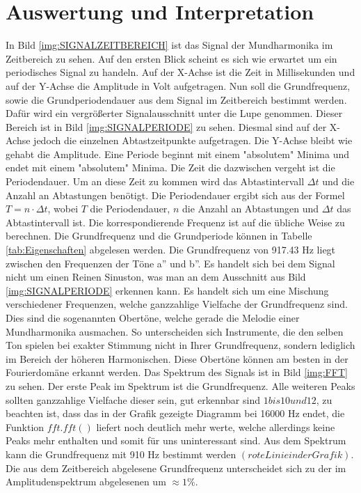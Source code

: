 \section{Auswertung und Interpretation}
\label{chap:VERSUCH_1_AUSWERTUNG}
In Bild \ref{img:SIGNALZEITBEREICH} ist das Signal der Mundharmonika im Zeitbereich zu sehen. Auf den ersten Blick scheint es sich wie erwartet um ein periodisches Signal zu handeln. Auf der X-Achse ist die Zeit in Millisekunden und auf der Y-Achse die Amplitude in Volt aufgetragen. Nun soll die Grundfrequenz, sowie die Grundperiodendauer aus dem Signal im Zeitbereich bestimmt werden. Dafür wird ein vergrößerter Signalausschnitt unter die Lupe genommen. Dieser Bereich ist in Bild \ref{img:SIGNALPERIODE} zu sehen. 
Diesmal sind auf der X-Achse jedoch die einzelnen Abtastzeitpunkte aufgetragen. Die Y-Achse bleibt wie gehabt die Amplitude. Eine Periode beginnt mit einem "absolutem" Minima und endet mit einem "absolutem" Minima. Die Zeit die dazwischen vergeht ist die Periodendauer. Um an diese Zeit zu kommen wird das Abtastintervall $\Delta t$ und die Anzahl an Abtastungen benötigt. Die Periodendauer ergibt sich aus der Formel $T = n \cdot \Delta t$, wobei $T$ die Periodendauer, $n$ die Anzahl an Abtastungen und $\Delta t$ das Abtastintervall ist. Die korrespondierende Frequenz ist auf die übliche Weise zu berechnen. Die Grundfrequenz und die Grundperiode können in Tabelle \ref{tab:Eigenschaften} abgelesen werden. Die Grundfrequenz von 917.43 Hz liegt zwischen den Frequenzen der Töne a'' und b''. Es handelt sich bei dem Signal nicht um einen Reinen Sinuston, was man an dem Ausschnitt aus Bild \ref{img:SIGNALPERIODE} erkennen kann. 
Es handelt sich um eine Mischung verschiedener Frequenzen, welche ganzzahlige Vielfache der Grundfrequenz sind. Dies sind die sogenannten Obertöne, welche gerade die Melodie einer Mundharmonika ausmachen. So unterscheiden sich Instrumente, die den selben Ton spielen bei exakter Stimmung nicht in Ihrer Grundfrequenz, sondern lediglich im Bereich der höheren Harmonischen. Diese Obertöne können am besten in der Fourierdomäne erkannt werden. 
Das Spektrum des Signals ist in Bild \ref{img:FFT} zu sehen. Der erste Peak im Spektrum ist die Grundfrequenz. Alle weiteren Peaks sollten ganzzahlige Vielfache dieser sein, gut erkennbar sind $1 bis 10 und 12$, zu beachten ist, dass das in der Grafik gezeigte Diagramm bei 16000 Hz endet, die Funktion $fft.fft()$ liefert noch deutlich mehr werte, welche allerdings keine Peaks mehr enthalten und somit für uns uninteressant sind. Aus dem Spektrum kann die Grundfrequenz mit 910 Hz bestimmt werden $(rote Linie in der Grafik)$. Die aus dem Zeitbereich abgelesene Grundfrequenz unterscheidet sich zu der im Amplitudenspektrum abgelesenen um $\approx 1\%$.
